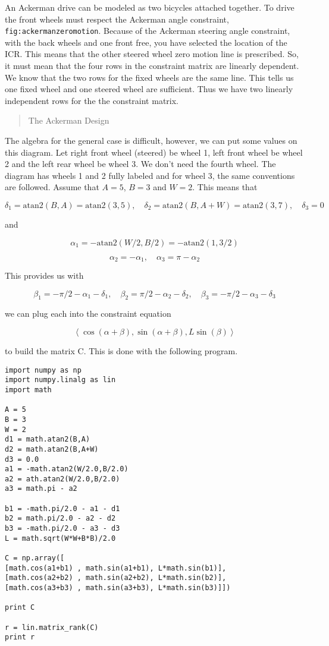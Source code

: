 An Ackerman drive can be modeled as two bicycles attached together. To
drive the front wheels must respect the Ackerman angle constraint,
\texttt{fig:ackermanzeromotion}. Because of the Ackerman steering angle
constraint, with the back wheels and one front free, you have selected
the location of the ICR. This means that the other steered wheel zero
motion line is prescribed. So, it must mean that the four rows in the
constraint matrix are linearly dependent. We know that the two rows for
the fixed wheels are the same line. This tells us one fixed wheel and
one steered wheel are sufficient. Thus we have two linearly independent
rows for the the constraint matrix.

\begin{quote}
The Ackerman Design
\end{quote}

The algebra for the general case is difficult, however, we can put some
values on this diagram. Let right front wheel (steered) be wheel 1, left
front wheel be wheel 2 and the left rear wheel be wheel 3. We don't need
the fourth wheel. The diagram has wheels 1 and 2 fully labeled and for
wheel 3, the same conventions are followed. Assume that \(A = 5\),
\(B=3\) and \(W=2\). This means that

\[\delta_1 = \mbox{atan2}(B,A) = \mbox{atan2}(3,5), \quad
\delta_2 = \mbox{atan2}(B,A+W) = \mbox{atan2}(3,7), \quad
\delta_3=0\]

and

\[\alpha_1 =  -\mbox{atan2}(W/2,B/2) = -\mbox{atan2}(1,3/2)\]

\[\alpha_2 =  -\alpha_1,  \quad   \alpha_3 = \pi - \alpha_2\]

This provides us with

\[\beta_1 = -\pi/2 - \alpha_1 - \delta_1, \quad
\beta_2 = \pi/2 - \alpha_2 - \delta_2, \quad
\beta_3 = -\pi/2 - \alpha_3 - \delta_3\]

we can plug each into the constraint equation

\[\left\langle \cos(\alpha+\beta) , \sin(\alpha+\beta), L\sin(\beta) \right\rangle\]

to build the matrix C. This is done with the following program.

\begin{verbatim}
import numpy as np
import numpy.linalg as lin
import math

A = 5
B = 3
W = 2
d1 = math.atan2(B,A)
d2 = math.atan2(B,A+W)
d3 = 0.0
a1 = -math.atan2(W/2.0,B/2.0)
a2 = ath.atan2(W/2.0,B/2.0)
a3 = math.pi - a2

b1 = -math.pi/2.0 - a1 - d1
b2 = math.pi/2.0 - a2 - d2
b3 = -math.pi/2.0 - a3 - d3
L = math.sqrt(W*W+B*B)/2.0

C = np.array([
[math.cos(a1+b1) , math.sin(a1+b1), L*math.sin(b1)],
[math.cos(a2+b2) , math.sin(a2+b2), L*math.sin(b2)],
[math.cos(a3+b3) , math.sin(a3+b3), L*math.sin(b3)]])

print C

r = lin.matrix_rank(C)
print r
\end{verbatim}

